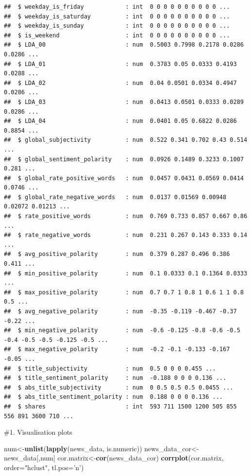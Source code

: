 \documentclass[]{article}
\newenvironment{Shaded}{\begin{snugshade}}{\end{snugshade}}
\newcommand{\CommentTok}[1]{\textcolor[rgb]{0.56,0.35,0.01}{\textit{#1}}}
\newcommand{\DataTypeTok}[1]{\textcolor[rgb]{0.13,0.29,0.53}{#1}}
\newcommand{\KeywordTok}[1]{\textcolor[rgb]{0.13,0.29,0.53}{\textbf{#1}}}
\newcommand{\NormalTok}[1]{#1}
\newcommand{\StringTok}[1]{\textcolor[rgb]{0.31,0.60,0.02}{#1}}
\begin{document}
\begin{verbatim}
##  $ weekday_is_friday            : int  0 0 0 0 0 0 0 0 0 0 ...
##  $ weekday_is_saturday          : int  0 0 0 0 0 0 0 0 0 0 ...
##  $ weekday_is_sunday            : int  0 0 0 0 0 0 0 0 0 0 ...
##  $ is_weekend                   : int  0 0 0 0 0 0 0 0 0 0 ...
##  $ LDA_00                       : num  0.5003 0.7998 0.2178 0.0286 0.0286 ...
##  $ LDA_01                       : num  0.3783 0.05 0.0333 0.4193 0.0288 ...
##  $ LDA_02                       : num  0.04 0.0501 0.0334 0.4947 0.0286 ...
##  $ LDA_03                       : num  0.0413 0.0501 0.0333 0.0289 0.0286 ...
##  $ LDA_04                       : num  0.0401 0.05 0.6822 0.0286 0.8854 ...
##  $ global_subjectivity          : num  0.522 0.341 0.702 0.43 0.514 ...
##  $ global_sentiment_polarity    : num  0.0926 0.1489 0.3233 0.1007 0.281 ...
##  $ global_rate_positive_words   : num  0.0457 0.0431 0.0569 0.0414 0.0746 ...
##  $ global_rate_negative_words   : num  0.0137 0.01569 0.00948 0.02072 0.01213 ...
##  $ rate_positive_words          : num  0.769 0.733 0.857 0.667 0.86 ...
##  $ rate_negative_words          : num  0.231 0.267 0.143 0.333 0.14 ...
##  $ avg_positive_polarity        : num  0.379 0.287 0.496 0.386 0.411 ...
##  $ min_positive_polarity        : num  0.1 0.0333 0.1 0.1364 0.0333 ...
##  $ max_positive_polarity        : num  0.7 0.7 1 0.8 1 0.6 1 1 0.8 0.5 ...
##  $ avg_negative_polarity        : num  -0.35 -0.119 -0.467 -0.37 -0.22 ...
##  $ min_negative_polarity        : num  -0.6 -0.125 -0.8 -0.6 -0.5 -0.4 -0.5 -0.5 -0.125 -0.5 ...
##  $ max_negative_polarity        : num  -0.2 -0.1 -0.133 -0.167 -0.05 ...
##  $ title_subjectivity           : num  0.5 0 0 0 0.455 ...
##  $ title_sentiment_polarity     : num  -0.188 0 0 0 0.136 ...
##  $ abs_title_subjectivity       : num  0 0.5 0.5 0.5 0.0455 ...
##  $ abs_title_sentiment_polarity : num  0.188 0 0 0 0.136 ...
##  $ shares                       : int  593 711 1500 1200 505 855 556 891 3600 710 ...
\end{verbatim}

\begin{Shaded}
\end{Shaded}

\#1. Visualisation plots

\begin{Shaded}
\begin{Highlighting}[]
\NormalTok{num<-}\KeywordTok{unlist}\NormalTok{(}\KeywordTok{lapply}\NormalTok{(news_data, is.numeric))}
\NormalTok{news_data_cor<-news_data[,num]}
\NormalTok{cor.matrix<-}\KeywordTok{cor}\NormalTok{(news_data_cor)}
\KeywordTok{corrplot}\NormalTok{(cor.matrix, }\DataTypeTok{order=}\StringTok{"hclust"}\NormalTok{, }\DataTypeTok{tl.pos=}\StringTok{'n'}\NormalTok{)}
\end{Highlighting}
\end{Shaded}
\end{document}
